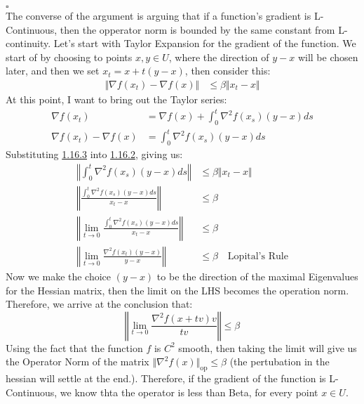 \documentclass[]{article}
\begin{document}
    $\square$
    \\[1.1em]
    The converse of the argument is arguing that if a function's gradient is L-Continuous, then the opperator norm is bounded by the same constant from L-continuity. Let's start with Taylor Expansion for the gradient of the function. We start of by choosing to points $x, y \in U$, where the direction of $y - x$ will be chosen later, and then we set $x_t = x + t(y - x)$, then consider this: 
    \begin{align*}\tag{1.16.2}\label{eqn:1.16.2}
        \Vert \nabla f(x_t) - \nabla f(x)\Vert &\le \beta \Vert x_t - x\Vert
    \end{align*}
    At this point, I want to bring out the Taylor series: 
    \begin{align*}\tag{1.16.3}\label{eqn:1.16.3}
        \nabla f(x_t) &= \nabla f(x) + \int_{0}^{t} 
            \nabla^2f(x_s)(y - x)
        ds
        \\
        \nabla f(x_t) - \nabla f(x) &= \int_{0}^{t} \nabla^2f(x_s)(y - x)ds
    \end{align*}
    Substituting \hyperref[eqn:1.16.3]{1.16.3} into \hyperref[eqn:1.16.2]{1.16.2}, giving us: 
    \begin{align*}\tag{1.16.4}\label{eqn:1.16.4}
        \left\Vert
            \int_{0}^{t} 
                \nabla^2 f(x_s)(y-x)
            ds
        \right\Vert
        &\le 
        \beta \Vert x_t - x\Vert
        \\
        \left\Vert
            \frac{
                \int_{0}^{t} 
                    \nabla^2 f(x_s)(y-x)
                ds
            }{x_t - x}
        \right\Vert
        &\le \beta
        \\
        \left\Vert
            \lim_{t\rightarrow 0}
            \frac{\int_{0}^{t} \nabla^2 f(x_s)(y - x)ds}{x_t - x}
        \right\Vert
        &\le 
        \beta
        \\
        \left\Vert
            \lim_{t \rightarrow 0}
            \frac{\nabla^2 f(x_t)(y - x)}{y - x}
        \right\Vert &\le \beta  
        \quad \text{Lopital's Rule}
    \end{align*}
    Now we make the choice $(y-x)$ to be the direction of the maximal Eigenvalues for the Hessian matrix, then the limit on the LHS becomes the operation norm. Therefore, we arrive at the conclusion that: 
    $$
    \left\Vert
        \lim_{t\rightarrow 0} \frac{\nabla^2f(x + tv)v}
        {
            tv
        }
    \right\Vert \le \beta
    $$
    Using the fact that the function $f$ is $C^2$ smooth, then taking the limit will give us the Operator Norm of the matrix $\Vert\nabla^2 f(x)\Vert_{\text{op}} \le \beta$ (the pertubation in the hessian will settle at the end.). Therefore, if the gradient of the function is L-Continuous, we know thta the operator is less than Beta, for every point $x \in U$.

        
\end{document}
